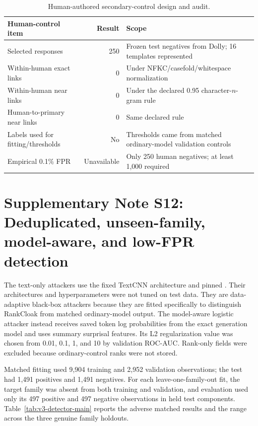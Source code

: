 \documentclass[fleqn,10pt]{wlscirep}
\begin{document}
\begin{table}[H]
\centering
\small
\begin{tabularx}{\textwidth}{L{0.28\textwidth}r Y}
\toprule
Human-control item & Result & Scope \\
\midrule
Selected responses & 250 & Frozen test negatives from Dolly; 16 templates represented \\
Within-human exact links & 0 & Under NFKC/casefold/whitespace normalization \\
Within-human near links & 0 & Under the declared 0.95 character-\(n\)-gram rule \\
Human-to-primary near links & 0 & Same declared rule \\
Labels used for fitting/thresholds & No & Thresholds came from matched ordinary-model validation controls \\
Empirical 0.1\% FPR & Unavailable & Only 250 human negatives; at least 1,000 required \\
\bottomrule
\end{tabularx}
\caption{\label{tab:v3-human-design}Human-authored secondary-control design and audit.}
\end{table}

\section*{Supplementary Note S12: Deduplicated, unseen-family, model-aware, and low-FPR detection}\label{si:s12}

The text-only attackers use the fixed TextCNN architecture and pinned . Their architectures and hyperparameters were not tuned on test data. They are data-adaptive black-box attackers because they are fitted specifically to distinguish RankCloak from matched ordinary-model output. The model-aware logistic attacker instead receives saved token log probabilities from the exact generation model and uses summary surprisal features. Its L2 regularization value was chosen from 0.01, 0.1, 1, and 10 by validation ROC-AUC. Rank-only fields were excluded because ordinary-control ranks were not stored.

Matched fitting used 9,904 training and 2,952 validation observations; the test had 1,491 positives and 1,491 negatives. For each leave-one-family-out fit, the target family was absent from both training and validation, and evaluation used only its 497 positive and 497 negative observations in held test components. Table~\ref{tab:v3-detector-main} reports the adverse matched results and the range across the three genuine family holdouts.
\end{document}

